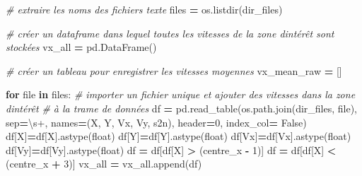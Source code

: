 \documentclass[
]{article}
\newenvironment{Shaded}{\begin{snugshade}}{\end{snugshade}}
\newcommand{\BuiltInTok}[1]{#1}
\newcommand{\CommentTok}[1]{\textcolor[rgb]{0.56,0.35,0.01}{\textit{#1}}}
\newcommand{\ControlFlowTok}[1]{\textcolor[rgb]{0.13,0.29,0.53}{\textbf{#1}}}
\newcommand{\DecValTok}[1]{\textcolor[rgb]{0.00,0.00,0.81}{#1}}
\newcommand{\KeywordTok}[1]{\textcolor[rgb]{0.13,0.29,0.53}{\textbf{#1}}}
\newcommand{\NormalTok}[1]{#1}
\newcommand{\OperatorTok}[1]{\textcolor[rgb]{0.81,0.36,0.00}{\textbf{#1}}}
\newcommand{\StringTok}[1]{\textcolor[rgb]{0.31,0.60,0.02}{#1}}
\newcommand{\VariableTok}[1]{\textcolor[rgb]{0.00,0.00,0.00}{#1}}
\begin{document}
\begin{Shaded}
\begin{Highlighting}[]
\CommentTok{\# extraire les noms des fichiers texte}
\NormalTok{files }\OperatorTok{=}\NormalTok{ os.listdir(dir\_files)}

\CommentTok{\# créer un dataframe dans lequel toutes les vitesses de la zone d\textquotesingle{}intérêt sont stockées}
\NormalTok{vx\_all }\OperatorTok{=}\NormalTok{ pd.DataFrame()}

\CommentTok{\# créer un tableau pour enregistrer les vitesses moyennes}
\NormalTok{vx\_mean\_raw }\OperatorTok{=}\NormalTok{ []}

\ControlFlowTok{for} \BuiltInTok{file} \KeywordTok{in}\NormalTok{ files:}
    \CommentTok{\# importer un fichier unique et ajouter des vitesses dans la zone d\textquotesingle{}intérêt}
    \CommentTok{\# à la trame de données}
\NormalTok{    df }\OperatorTok{=}\NormalTok{ pd.read\_table(os.path.join(dir\_files, }\BuiltInTok{file}\NormalTok{),}
\NormalTok{                       sep}\OperatorTok{=}\StringTok{\textquotesingle{}\textbackslash{}s+\textquotesingle{}}\NormalTok{,}
\NormalTok{                       names}\OperatorTok{=}\NormalTok{(}\StringTok{\textquotesingle{}X\textquotesingle{}}\NormalTok{, }\StringTok{\textquotesingle{}Y\textquotesingle{}}\NormalTok{, }\StringTok{\textquotesingle{}Vx\textquotesingle{}}\NormalTok{, }\StringTok{\textquotesingle{}Vy\textquotesingle{}}\NormalTok{, }\StringTok{\textquotesingle{}s2n\textquotesingle{}}\NormalTok{),}
\NormalTok{                       header}\OperatorTok{=}\DecValTok{0}\NormalTok{,}
\NormalTok{                       index\_col}\OperatorTok{=} \VariableTok{False}\NormalTok{)  }
\NormalTok{    df[}\StringTok{\textquotesingle{}X\textquotesingle{}}\NormalTok{]}\OperatorTok{=}\NormalTok{df[}\StringTok{\textquotesingle{}X\textquotesingle{}}\NormalTok{].astype(}\StringTok{\textquotesingle{}float\textquotesingle{}}\NormalTok{)}
\NormalTok{    df[}\StringTok{\textquotesingle{}Y\textquotesingle{}}\NormalTok{]}\OperatorTok{=}\NormalTok{df[}\StringTok{\textquotesingle{}Y\textquotesingle{}}\NormalTok{].astype(}\StringTok{\textquotesingle{}float\textquotesingle{}}\NormalTok{)}
\NormalTok{    df[}\StringTok{\textquotesingle{}Vx\textquotesingle{}}\NormalTok{]}\OperatorTok{=}\NormalTok{df[}\StringTok{\textquotesingle{}Vx\textquotesingle{}}\NormalTok{].astype(}\StringTok{\textquotesingle{}float\textquotesingle{}}\NormalTok{)}
\NormalTok{    df[}\StringTok{\textquotesingle{}Vy\textquotesingle{}}\NormalTok{]}\OperatorTok{=}\NormalTok{df[}\StringTok{\textquotesingle{}Vy\textquotesingle{}}\NormalTok{].astype(}\StringTok{\textquotesingle{}float\textquotesingle{}}\NormalTok{)}
\NormalTok{    df }\OperatorTok{=}\NormalTok{ df[df[}\StringTok{\textquotesingle{}X\textquotesingle{}}\NormalTok{] }\OperatorTok{\textgreater{}}\NormalTok{ (centre\_x }\OperatorTok{{-}} \DecValTok{1}\NormalTok{)]}
\NormalTok{    df }\OperatorTok{=}\NormalTok{ df[df[}\StringTok{\textquotesingle{}X\textquotesingle{}}\NormalTok{] }\OperatorTok{\textless{}}\NormalTok{ (centre\_x }\OperatorTok{+} \DecValTok{3}\NormalTok{)]}
\NormalTok{    vx\_all }\OperatorTok{=}\NormalTok{ vx\_all.append(df)}


\end{Highlighting}
\end{Shaded}
\end{document}
